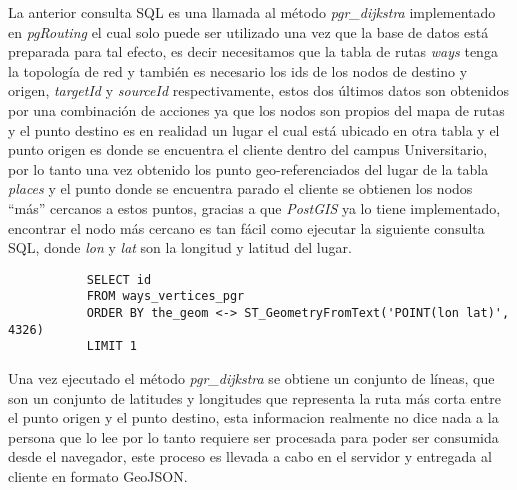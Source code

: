       La anterior consulta SQL es una llamada al método \emph{pgr\_dijkstra} implementado en \emph{pgRouting} el cual solo puede ser utilizado una vez que la base de datos está preparada para tal efecto, es decir necesitamos que la tabla de rutas \emph{ways} tenga la topología de red y también es necesario los ids de los nodos de destino y origen, \emph{targetId} y \emph{sourceId} respectivamente, estos dos últimos datos son obtenidos por una combinación de acciones ya que los nodos son propios del mapa de rutas y el punto destino es en realidad un lugar el cual está ubicado en otra tabla y el punto origen es donde se encuentra el cliente dentro del campus Universitario, por lo tanto una vez obtenido los punto geo-referenciados del lugar de la tabla \emph{places} y el punto donde se encuentra parado el cliente se obtienen los nodos ``más'' cercanos a estos puntos, gracias a que \emph{PostGIS} ya lo tiene implementado, encontrar el nodo más cercano es tan fácil como ejecutar la siguiente consulta SQL, donde \emph{lon} y \emph{lat} son la longitud y latitud del lugar.

       \begin{verbatim}
           SELECT id
           FROM ways_vertices_pgr
           ORDER BY the_geom <-> ST_GeometryFromText('POINT(lon lat)', 4326)
           LIMIT 1
       \end{verbatim}

       Una vez ejecutado el método \emph{pgr\_dijkstra} se obtiene un conjunto de líneas, que son un conjunto de latitudes y longitudes que representa la ruta más corta entre el punto origen y el punto destino, esta informacion realmente no dice nada a la persona que lo lee por lo tanto requiere ser procesada para poder ser consumida desde el navegador, este proceso es llevada a cabo en el servidor y entregada al cliente en formato GeoJSON.\\









